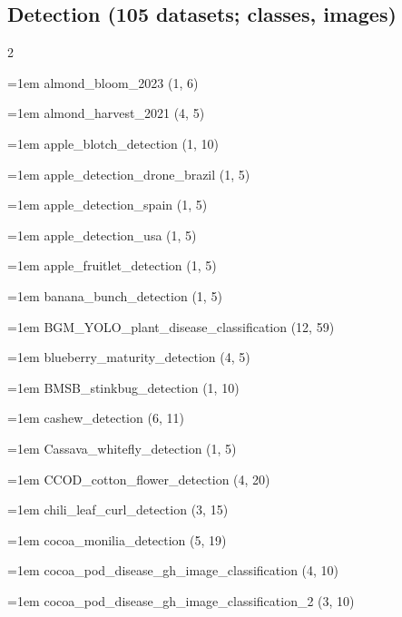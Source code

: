 \subsection*{Detection (105 datasets; classes, images)}
\begin{multicols}{2}\raggedright
\hangindent=1em almond\_\allowbreak{}bloom\_\allowbreak{}2023 (1, 6)\par
\hangindent=1em almond\_\allowbreak{}harvest\_\allowbreak{}2021 (4, 5)\par
\hangindent=1em apple\_\allowbreak{}blotch\_\allowbreak{}detection (1, 10)\par
\hangindent=1em apple\_\allowbreak{}detection\_\allowbreak{}drone\_\allowbreak{}brazil (1, 5)\par
\hangindent=1em apple\_\allowbreak{}detection\_\allowbreak{}spain (1, 5)\par
\hangindent=1em apple\_\allowbreak{}detection\_\allowbreak{}usa (1, 5)\par
\hangindent=1em apple\_\allowbreak{}fruitlet\_\allowbreak{}detection (1, 5)\par
\hangindent=1em banana\_\allowbreak{}bunch\_\allowbreak{}detection (1, 5)\par
\hangindent=1em BGM\_\allowbreak{}YOLO\_\allowbreak{}plant\_\allowbreak{}disease\_\allowbreak{}classification (12, 59)\par
\hangindent=1em blueberry\_\allowbreak{}maturity\_\allowbreak{}detection (4, 5)\par
\hangindent=1em BMSB\_\allowbreak{}stinkbug\_\allowbreak{}detection (1, 10)\par
\hangindent=1em cashew\_\allowbreak{}detection (6, 11)\par
\hangindent=1em Cassava\_\allowbreak{}whitefly\_\allowbreak{}detection (1, 5)\par
\hangindent=1em CCOD\_\allowbreak{}cotton\_\allowbreak{}flower\_\allowbreak{}detection (4, 20)\par
\hangindent=1em chili\_\allowbreak{}leaf\_\allowbreak{}curl\_\allowbreak{}detection (3, 15)\par
\hangindent=1em cocoa\_\allowbreak{}monilia\_\allowbreak{}detection (5, 19)\par
\hangindent=1em cocoa\_\allowbreak{}pod\_\allowbreak{}disease\_\allowbreak{}gh\_\allowbreak{}image\_\allowbreak{}classification (4, 10)\par
\hangindent=1em cocoa\_\allowbreak{}pod\_\allowbreak{}disease\_\allowbreak{}gh\_\allowbreak{}image\_\allowbreak{}classification\_\allowbreak{}2 (3, 10)\par

\end{multicols}
